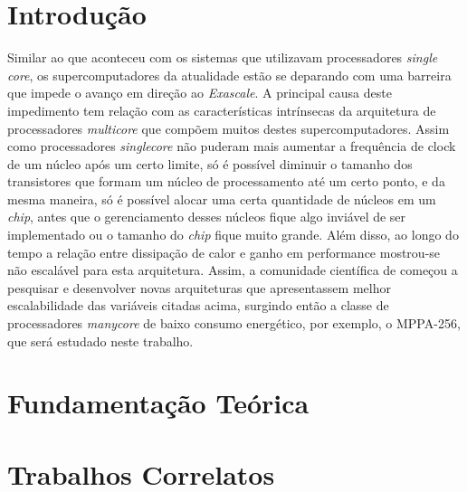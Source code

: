 \begin{resumo}[Resumo Estendido]
\section*{Introdução} %
Similar ao que aconteceu com os sistemas que utilizavam processadores \textit{single core}, os supercomputadores da atualidade estão se deparando com uma barreira que impede o avanço em direção ao \textit{Exascale}. A principal causa deste impedimento tem relação com as características intrínsecas da arquitetura de processadores \textit{multicore} que compõem muitos destes supercomputadores. Assim como processadores \textit{singlecore} não puderam mais aumentar a frequência de clock de um núcleo após um certo limite, só é possível diminuir o tamanho dos transistores que formam um núcleo de processamento até um certo ponto, e da mesma maneira, só é possível alocar uma certa quantidade de núcleos em um \textit{chip}, antes que o gerenciamento desses núcleos fique algo inviável de ser implementado ou o tamanho do \textit{chip} fique muito grande. Além disso, ao longo do tempo a relação entre dissipação de calor e ganho em performance mostrou-se não escalável para esta arquitetura. Assim, a comunidade científica de \HPC começou a pesquisar e desenvolver novas arquiteturas que apresentassem melhor escalabilidade das variáveis citadas acima, surgindo então a classe de processadores \textit{manycore} de baixo consumo energético, por exemplo, o MPPA-256, que será estudado neste trabalho.


\section*{Fundamentação Teórica} 

\section*{Trabalhos Correlatos} 
  

\end{resumo}
